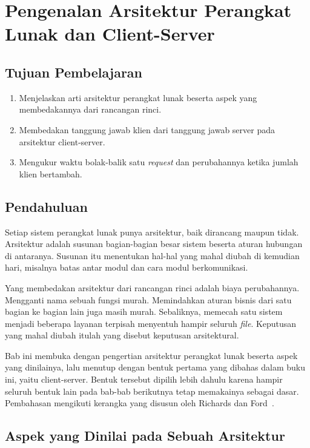 \chapter{Pengenalan Arsitektur Perangkat Lunak dan Client-Server}

\section*{Tujuan Pembelajaran}

\begin{enumerate}
  \item Menjelaskan arti arsitektur perangkat lunak beserta aspek yang
    membedakannya dari rancangan rinci.
  \item Membedakan tanggung jawab klien dari tanggung jawab server pada
    arsitektur client-server.
  \item Mengukur waktu bolak-balik satu \textit{request} dan perubahannya ketika
    jumlah klien bertambah.
\end{enumerate}

\section{Pendahuluan}

Setiap sistem perangkat lunak punya arsitektur, baik dirancang maupun tidak.
Arsitektur adalah susunan bagian-bagian besar sistem beserta aturan hubungan di
antaranya. Susunan itu menentukan hal-hal yang mahal diubah di kemudian hari,
misalnya batas antar modul dan cara modul berkomunikasi.

Yang membedakan arsitektur dari rancangan rinci adalah biaya perubahannya.
Mengganti nama sebuah fungsi murah. Memindahkan aturan bisnis dari satu bagian
ke bagian lain juga masih murah. Sebaliknya, memecah satu sistem menjadi
beberapa layanan terpisah menyentuh hampir seluruh \textit{file}. Keputusan yang mahal
diubah itulah yang disebut keputusan arsitektural.

Bab ini membuka dengan pengertian arsitektur perangkat
lunak beserta aspek yang
dinilainya, lalu menutup dengan bentuk pertama yang dibahas dalam buku ini,
yaitu client-server. Bentuk tersebut dipilih lebih dahulu karena
hampir seluruh
bentuk lain pada bab-bab berikutnya tetap memakainya sebagai dasar. Pembahasan
mengikuti kerangka yang disusun oleh Richards dan
Ford~\cite{richards2020fundamentals}.

\section{Aspek yang Dinilai pada Sebuah Arsitektur}


